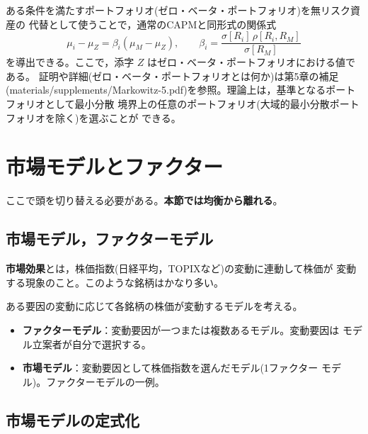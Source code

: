 \begin{keypoint}[ゼロベータCAPM]
ある条件を満たすポートフォリオ(ゼロ・ベータ・ポートフォリオ)を無リスク資産の
代替として使うことで，通常のCAPMと同形式の関係式
\begin{equation}
\mu_i - \mu_Z = \beta_i(\mu_M - \mu_Z),\qquad
\beta_i = \frac{\sigma[R_i]\,\rho[R_i,R_M]}{\sigma[R_M]}
\end{equation}
を導出できる。ここで，添字 $Z$ はゼロ・ベータ・ポートフォリオにおける値である。
証明や詳細(ゼロ・ベータ・ポートフォリオとは何か)は第5章の補足
(materials/supplements/Markowitz-5.pdf)を参照。理論上は，基準となるポートフォリオとして最小分散
境界上の任意のポートフォリオ(大域的最小分散ポートフォリオを除く)を選ぶことが
できる。
\end{keypoint}

\section{市場モデルとファクター}

ここで頭を切り替える必要がある。\textbf{本節では均衡から離れる}。

\subsection{市場モデル，ファクターモデル}

\begin{definition}
\textbf{市場効果}とは，株価指数(日経平均，TOPIXなど)の変動に連動して株価が
変動する現象のこと。このような銘柄はかなり多い。
\end{definition}

ある要因の変動に応じて各銘柄の株価が変動するモデルを考える。
\begin{itemize}
\item \textbf{ファクターモデル}：変動要因が一つまたは複数あるモデル。変動要因は
モデル立案者が自分で選択する。
\item \textbf{市場モデル}：変動要因として株価指数を選んだモデル(1ファクター
モデル)。ファクターモデルの一例。
\end{itemize}

\subsection{市場モデルの定式化}

